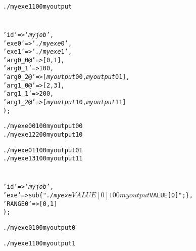 \documentclass[a4paper,10pt]{report}
\begin{document}
\begin{boxnote}
\begin{alltt}
./myexe 1 100 myoutput
\end{alltt}
\end{boxnote}

\section{}

\begin{boxnote}
\begin{alltt}
%myjob = (
    'id' => '\textit{myjob}',
    'exe0' => '\textit{./myexe}0',
    'exe1' => '\textit{./myexe}1',
    'arg0_0@' => [0,1],
    'arg0_1' => 100,
    'arg0_2@' => [\textit{myoutput}00,\textit{myoutput}01],
    'arg1_0@' => [2,3],
    'arg1_1' => 200,
    'arg1_2@' => [\textit{myoutput}10,\textit{myoutput}11]
);
\end{alltt}
\end{boxnote}

\begin{boxnote}
\begin{alltt}
./myexe0 0 100 myoutput00
./myexe1 2 200 myoutput10
\end{alltt}
\end{boxnote}

\begin{boxnote}
\begin{alltt}
./myexe0 1 100 myoutput01
./myexe1 3 100 myoutput11
\end{alltt}
\end{boxnote}


\section{}

\begin{boxnote}
\begin{alltt}
%myjob = (
  'id' => '\textit{myjob}',
  'exe' => sub \{ "\textit{./myexe} $VALUE[0] 100 \textit{myoutput} $VALUE[0]"; \},
  'RANGE0' => [0,1]
);
\end{alltt}
\end{boxnote}

\begin{boxnote}
\begin{alltt}
./myexe 0 100 myoutput0
\end{alltt}
\end{boxnote}

\begin{boxnote}
\begin{alltt}
./myexe 1 100 myoutput1
\end{alltt}
\end{boxnote}
\end{document}
